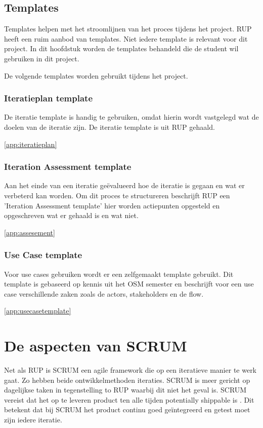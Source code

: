 \documentclass[a4paper, 11pt, oneside]{report}
\begin{document}
\subsection{Templates}
Templates helpen met het stroomlijnen van het proces tijdens het project. RUP heeft een ruim aanbod van templates. Niet iedere template is relevant voor dit project. In dit hoofdstuk worden de templates behandeld die de student wil gebruiken in dit project.

De volgende templates worden gebruikt tijdens het project.

\subsubsection{Iteratieplan template}

De iteratie template is handig te gebruiken, omdat hierin  wordt vastgelegd wat de doelen van de iteratie zijn. De iteratie template is uit RUP gehaald.

\autoref{app:iteratieplan} 

\subsubsection{Iteration Assessment template}

Aan het einde van een iteratie geëvalueerd hoe de iteratie is gegaan en wat er verbeterd kan worden. Om dit proces te structureren beschrijft RUP een 'Iteration Assessment template' hier worden actiepunten opgesteld en opgeschreven wat er gehaald is en wat niet.

\autoref{app:assesement} 
\subsubsection{Use Case template }

Voor use cases gebruiken wordt er een zelfgemaakt template gebruikt. Dit template is gebaseerd op kennis uit het OSM semester en beschrijft voor een use case verschillende zaken zoals de actors, stakeholders en de flow.

\autoref{app:usecasetemplate} 

\section{De aspecten van SCRUM}
Net als RUP is SCRUM een agile framework die op een iteratieve manier te werk gaat.
Zo hebben beide ontwikkelmethoden iteraties.
SCRUM is meer gericht op dagelijkse taken in tegenstelling to RUP waarbij dit niet het geval is.
SCRUM vereist dat het op te leveren product ten alle tijden potentially shippable is \cite{james}. 
Dit betekent dat bij SCRUM het product continu goed geïntegreerd en getest moet zijn iedere iteratie. 
\end{document}
